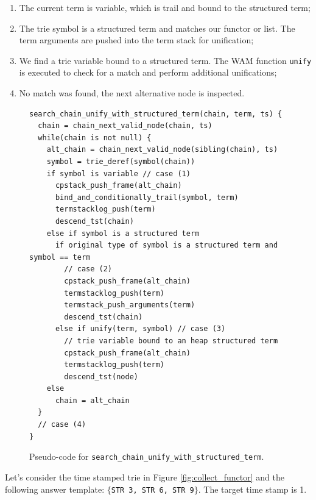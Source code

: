 \begin{enumerate}
  \item The current term is variable, which is trail and bound to the structured term;
  \item The trie symbol is a structured term and matches our functor or list.
  The term arguments are pushed into the term stack for unification;
  \item We find a trie variable bound to a structured term. The WAM function \texttt{unify} is executed to check for a match and perform additional unifications;
  \item No match was found, the next alternative node is inspected.
\end{enumerate}

\begin{figure}[ht]
\begin{Verbatim}
search_chain_unify_with_structured_term(chain, term, ts) {
  chain = chain_next_valid_node(chain, ts)
  while(chain is not null) {
    alt_chain = chain_next_valid_node(sibling(chain), ts)
    symbol = trie_deref(symbol(chain))
    if symbol is variable // case (1)
      cpstack_push_frame(alt_chain)
      bind_and_conditionally_trail(symbol, term)
      termstacklog_push(term)
      descend_tst(chain)
    else if symbol is a structured term
      if original type of symbol is a structured term and symbol == term
        // case (2)
        cpstack_push_frame(alt_chain)
        termstacklog_push(term)
        termstack_push_arguments(term)
        descend_tst(chain)
      else if unify(term, symbol) // case (3)
        // trie variable bound to an heap structured term
        cpstack_push_frame(alt_chain)
        termstacklog_push(term)
        descend_tst(node)
    else
      chain = alt_chain
  }
  // case (4)
}
\end{Verbatim}
\caption{Pseudo-code for \texttt{search\_chain\_unify\_with\_structured\_term}.}
\label{fig:search_chain_unify_with_structured_term}
\end{figure}

Let's consider the time stamped trie in Figure \ref{fig:collect_functor}
and the following answer template: $\{$\texttt{STR 3, STR 6, STR 9}$\}$.
The target time stamp is 1.

